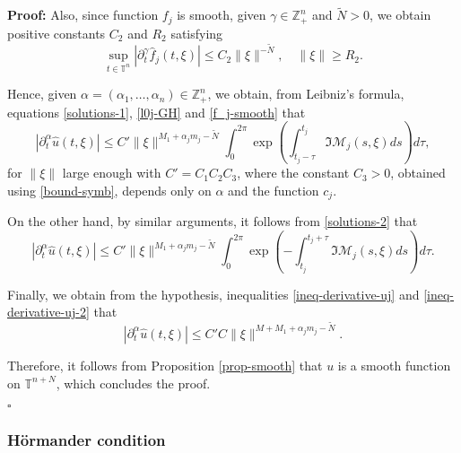 \documentclass[12pt]{elsarticle}
\numberwithin{equation}{section}
\newenvironment{proof}[1][\noindent \textbf{Proof: }]{#1}{ \hfill $\square$ \vspace{2mm}}
\begin{document}
\begin{proof}
	Also, since  function $f_j$  is smooth, given 
	$\gamma \in \mathbb{Z}_+^n$ and $\widetilde{N}>0$, we obtain  positive constants $C_2$ and $R_2$ satisfying
	\begin{equation}\label{f_j-smooth}
	\sup_{t \in \mathbb{T}^n}  |\partial_{t}^{\gamma} \widehat{f}_j(t, \xi)| \leq C_2 \|\xi\|^{-\widetilde{N}}, \quad \|\xi\|\geq R_2.
	\end{equation}
	

Hence, given  $\alpha =(\alpha_1, \ldots, \alpha_n) \in \mathbb{Z}^n_+$,  we obtain, from Leibniz's formula, equations \eqref{solutions-1}, \eqref{l0j-GH} and \eqref{f_j-smooth} that
	\begin{equation}\label{ineq-derivative-uj}
	|\partial_t^{\alpha}  \widehat{u}(t, \xi)| \leq
	C'\|\xi\|^{M_1 + \alpha_j m_j - \widetilde{N}}
	\int_{0}^{2\pi} \exp \left(\int_{t_j-\tau}^{t_j}\Im \mathcal{M}_j(s,\xi)ds \right)d\tau,
	\end{equation}
	for $\|\xi\|$ large enough with $C' = C_1C_2C_3$, where the constant $C_3>0$, obtained using \eqref{bound-symb}, depends only on $\alpha$ and the function $c_j$.

	
	On the other hand, by similar arguments, it follows from  \eqref{solutions-2} that
	\begin{equation}\label{ineq-derivative-uj-2}
	|\partial_t^{\alpha}  \widehat{u}(t, \xi)| \leq
	C'\|\xi\|^{M_1 + \alpha_jm_j - \widetilde{N}}
	\int_{0}^{2\pi} \exp \left(-\int_{t_j}^{t_j+\tau}\Im \mathcal{M}_j(s,\xi)ds \right)d\tau.
	\end{equation}
	
	
	Finally, we obtain from the hypothesis, inequalities \eqref{ineq-derivative-uj} and \eqref{ineq-derivative-uj-2} that
	$$
	|\partial_t^{\alpha}  \widehat{u}(t, \xi)| \leq
	C'C\|\xi\|^{M + M_1 + \alpha_j m_j - \widetilde{N}}.
	$$
	
	Therefore, it follows from Proposition \ref{prop-smooth}  that $u$ is a smooth function on $\mathbb{T}^{n+N}$, which concludes the proof.
	
\end{proof}



\subsubsection{H\"{o}rmander condition \label{sec-H-cond}} 
\end{document}
